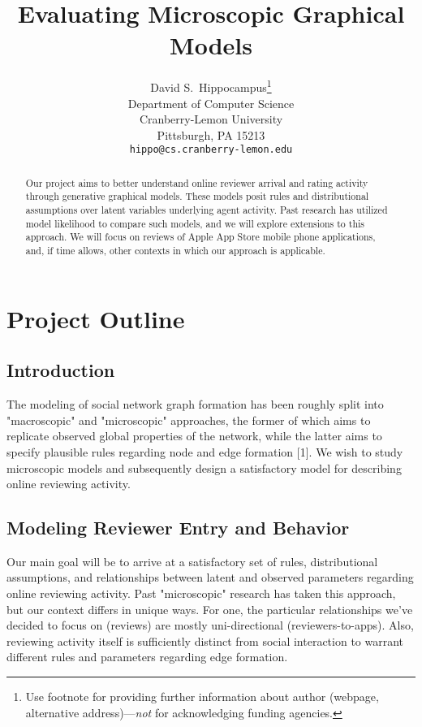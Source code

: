 \documentclass{article}
\title{Evaluating Microscopic Graphical Models}
\author{
  David S.~Hippocampus\thanks{Use footnote for providing further
    information about author (webpage, alternative
    address)---\emph{not} for acknowledging funding agencies.} \\
  Department of Computer Science\\
  Cranberry-Lemon University\\
  Pittsburgh, PA 15213 \\
  \texttt{hippo@cs.cranberry-lemon.edu} \\
}
\begin{document}

\maketitle

\begin{abstract}
 Our project aims to better understand online reviewer arrival and rating activity through generative graphical models. These models posit rules and distributional assumptions over latent variables underlying agent activity. Past research has utilized model likelihood to compare such models, and we will explore extensions to this approach. We will focus on reviews of Apple App Store mobile phone applications, and, if time allows, other contexts in which our approach is applicable.
\end{abstract}

\section{Project Outline}
 
\subsection{Introduction}

The modeling of social network graph formation has been roughly split into "macroscopic" and "microscopic" approaches, the former of which aims to replicate observed global properties of the network, while the latter aims to specify plausible rules regarding node and edge formation [1]. We wish to study microscopic models and subsequently design a satisfactory model for describing online reviewing activity.

\subsection{Modeling Reviewer Entry and Behavior}

Our main goal will be to arrive at a satisfactory set of rules, distributional assumptions, and relationships between latent and observed parameters regarding online reviewing activity. Past "microscopic" research has taken this approach, but our context differs in unique ways. For one, the particular relationships we've decided to focus on (reviews) are mostly uni-directional (reviewers-to-apps). Also, reviewing activity itself is sufficiently distinct from social interaction to warrant different rules and parameters regarding edge formation. 
\end{document}

